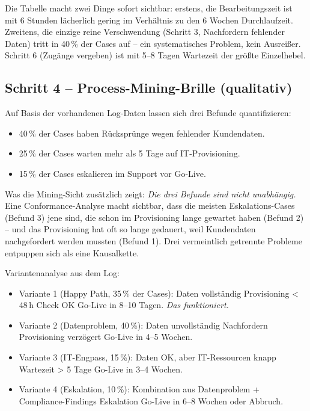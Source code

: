 \documentclass[11pt,a4paper,oneside]{article}
\begin{document}
\noindent Die Tabelle macht zwei Dinge sofort sichtbar: erstens, die Bearbeitungszeit ist mit 6 Stunden lächerlich gering im Verhältnis zu den 6 Wochen Durchlaufzeit. Zweitens, die einzige reine Verschwendung (Schritt 3, Nachfordern fehlender Daten) tritt in 40\,\% der Cases auf -- ein systematisches Problem, kein Ausreißer. Schritt 6 (Zugänge vergeben) ist mit 5--8 Tagen Wartezeit der größte Einzelhebel.

\subsection{Schritt 4 -- Process-Mining-Brille (qualitativ)}

Auf Basis der vorhandenen Log-Daten lassen sich drei Befunde quantifizieren:

\begin{itemize}
  \item 40\,\% der Cases haben Rücksprünge wegen fehlender Kundendaten.
  \item 25\,\% der Cases warten mehr als 5 Tage auf IT-Provisioning.
  \item 15\,\% der Cases eskalieren im Support vor Go-Live.
\end{itemize}

Was die Mining-Sicht zusätzlich zeigt: \emph{Die drei Befunde sind nicht unabhängig.} Eine Conformance-Analyse macht sichtbar, dass die meisten Eskalations-Cases (Befund 3) jene sind, die schon im Provisioning lange gewartet haben (Befund 2) -- und das Provisioning hat oft so lange gedauert, weil Kundendaten nachgefordert werden mussten (Befund 1). Drei vermeintlich getrennte Probleme entpuppen sich als eine Kausalkette.

Variantenanalyse aus dem Log:
\begin{itemize}
  \item Variante 1 (Happy Path, 35\,\% der Cases): Daten vollständig \textrightarrow{} Provisioning \textless{} 48\,h \textrightarrow{} Check OK \textrightarrow{} Go-Live in 8--10 Tagen. \emph{Das funktioniert.}
  \item Variante 2 (Datenproblem, 40\,\%): Daten unvollständig \textrightarrow{} Nachfordern \textrightarrow{} Provisioning verzögert \textrightarrow{} Go-Live in 4--5 Wochen.
  \item Variante 3 (IT-Engpass, 15\,\%): Daten OK, aber IT-Ressourcen knapp \textrightarrow{} Wartezeit \textgreater{} 5 Tage \textrightarrow{} Go-Live in 3--4 Wochen.
  \item Variante 4 (Eskalation, 10\,\%): Kombination aus Datenproblem + Compliance-Findings \textrightarrow{} Eskalation \textrightarrow{} Go-Live in 6--8 Wochen oder Abbruch.
\end{itemize}
\end{document}
